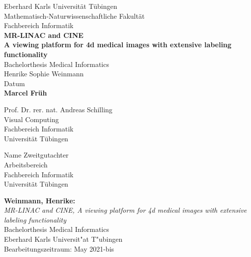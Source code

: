 \documentclass[12pt,a4paper,twoside]{report}
\begin{document}

\begin{titlepage}
 \begin{center}
  {\LARGE Eberhard Karls Universität Tübingen}\\
  {\large Mathematisch-Naturwissenschaftliche Fakultät\\
  Fachbereich Informatik\\[2cm]}
  {\Huge\bf  MR-LINAC and CINE\\[1.5cm]}
{\Large\bf A viewing platform for 4d medical images with extensive labeling functionality\\[0.8cm]}
  {\Large Bachelorthesis Medical Informatics\\[3.0cm]}
  {\Large Henrike Sophie Weinmann}\\[0.5cm]
  Datum\\[3cm]
{\small\bf Marcel Früh}\\[1.0cm]
  \parbox{7cm}{\begin{center}{
  	\large Prof. Dr. rer. nat. Andreas Schilling}\\
	  Visual Computing\\
	  Fachbereich Informatik\\
	  Universität Tübingen
	  \end{center}}\hfill\parbox{7cm}{\begin{center}
  {\large Name Zweitgutachter}\\
	  Arbeitsbereich\\
	  Fachbereich Informatik\\
	  Universität Tübingen \end{center}
 }
  \end{center}
\end{titlepage}


\thispagestyle{empty}
\vspace*{\fill}
\begin{minipage}{11.2cm}
\textbf{Weinmann, Henrike:}\\
\emph{MR-LINAC and CINE, A viewing platform for 4d medical images with extensive labeling functionality}\\ Bachelorthesis Medical Informatics\\
Eberhard Karls Universit"at T"ubingen\\
Bearbeitungszeitraum: May 2021-bis
\end{minipage}
\newpage
\end{document}
